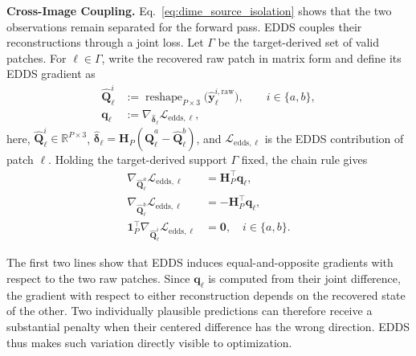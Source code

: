 \documentclass[10pt,journal,compsoc]{IEEEtran}
\begin{document}
\noindent\textbf{Cross-Image Coupling.}
Eq.~\eqref{eq:dime_source_isolation} shows that the two observations remain separated for the forward pass. EDDS couples their reconstructions through a joint loss. Let $\Gamma$ be the target-derived set of valid patches. For $\ell\in\Gamma$, write the recovered raw patch in matrix form and define its EDDS gradient as
\begin{equation}
\begin{aligned}
\hat{\mathbf{Q}}^{i}_{\ell}
&:=\operatorname{reshape}_{P\times3}
\bigl(\hat{\mathbf{y}}^{i,\mathrm{raw}}_{\ell}\bigr),
\qquad i\in\{a,b\},\\
\mathbf{q}_{\ell}
&:=
\nabla_{\hat{\boldsymbol{\delta}}_{\ell}}
\mathcal{L}_{\mathrm{edds},\ell},
\end{aligned}
\label{eq:dime_cross_image_terms}
\end{equation}
here, $\hat{\mathbf{Q}}^{i}_{\ell}\in\mathbb{R}^{P\times3}$, $\hat{\boldsymbol{\delta}}_{\ell}=\mathbf{H}_{P}(\hat{\mathbf{Q}}^{a}_{\ell}-\hat{\mathbf{Q}}^{b}_{\ell})$, and $\mathcal{L}_{\mathrm{edds},\ell}$ is the EDDS contribution of patch $\ell$. Holding the target-derived support $\Gamma$ fixed, the chain rule gives
\begin{equation}
\begin{aligned}
\nabla_{\hat{\mathbf{Q}}^{a}_{\ell}}
\mathcal{L}_{\mathrm{edds},\ell}
&=
\mathbf{H}_{P}^{\top}\mathbf{q}_{\ell},\\
\nabla_{\hat{\mathbf{Q}}^{b}_{\ell}}
\mathcal{L}_{\mathrm{edds},\ell}
&=
-\mathbf{H}_{P}^{\top}\mathbf{q}_{\ell},\\
\mathbf{1}_{P}^{\top}
\nabla_{\hat{\mathbf{Q}}^{i}_{\ell}}
\mathcal{L}_{\mathrm{edds},\ell}
&=
\mathbf{0},
\quad i\in\{a,b\}.
\end{aligned}
\label{eq:dime_relational_gradient}
\end{equation}

The first two lines show that EDDS induces equal-and-opposite gradients with respect to the two raw patches. Since $\mathbf{q}_{\ell}$ is computed from their joint difference, the gradient with respect to either reconstruction depends on the recovered state of the other. Two individually plausible predictions can therefore receive a substantial penalty when their centered difference has the wrong direction. EDDS thus makes such variation directly visible to optimization.
\end{document}
